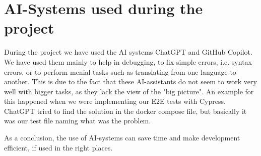 \section{AI-Systems used during the project}

During the project we have used the AI systems ChatGPT and GitHub Copilot.
We have used them mainly to help in debugging, to fix simple errors, i.e. syntax errors, or to perform menial tasks such as translating from one language to another.
This is due to the fact that these AI-assistants do not seem to work very well with bigger tasks, as they lack the view of the "big picture".
An example for this happened when we were implementing our E2E tests with Cypress. ChatGPT tried to find the solution in the docker compose file, but basically it was our test file naming what was the problem.

As a conclusion, the use of AI-systems can save time and make development efficient, if used in the right places.
